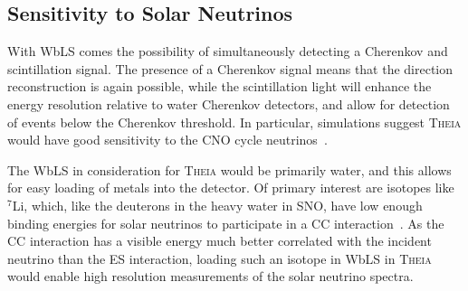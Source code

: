 \subsection{Sensitivity to Solar Neutrinos}
With WbLS comes the possibility of simultaneously detecting a Cherenkov and scintillation signal.
The presence of a Cherenkov signal means that the direction reconstruction is again possible, while the scintillation light will enhance the energy resolution relative to water Cherenkov detectors, and allow for detection of events below the Cherenkov threshold.
In particular, simulations suggest \textsc{Theia} would have good sensitivity to the CNO cycle neutrinos~\cite{theia_solar}.

The WbLS in consideration for \textsc{Theia} would be primarily water, and this allows for easy loading of metals into the detector.
Of primary interest are isotopes like $^7$Li, which, like the deuterons in the heavy water in SNO, have low enough binding energies for solar neutrinos to participate in a CC interaction~\cite{asdc}.
As the CC interaction has a visible energy much better correlated with the incident neutrino than the ES interaction, loading such an isotope in WbLS in \textsc{Theia} would enable high resolution measurements of the solar neutrino spectra. 



